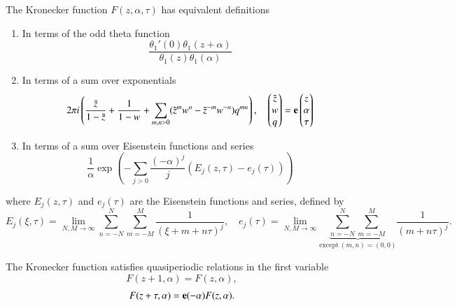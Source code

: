 \begin{definition}
    The Kronecker function $F(z,\alpha,\tau)$ has equivalent definitions
    \begin{enumerate}
        \item In terms of the odd theta function
        \begin{equation}\frac{\theta_1'(0)\theta_1(z+\alpha)}{\theta_1(z)\theta_1(\alpha)}\end{equation}
        \item In terms of a sum over exponentials
        \begin{equation} 2\pi i \left(\frac{\tilde z}{1-\tilde z} + \frac{1}{1-w} + \sum_{m,n > 0} (\tilde z^m w^n - \tilde z^{-m} w^{-n}) q^{mn}\right) , \quad \begin{pmatrix} \tilde z \\ w \\ q \end{pmatrix} = \mathbf{e} \begin{pmatrix}z \\ \alpha \\ \tau\end{pmatrix} \label{eqnB12:KroneckerSecondDef} \end{equation}
        \item In terms of a sum over Eisenstein functions and series
        \begin{equation}\frac{1}{\alpha} \exp\left(-\sum_{j > 0} \frac{(-\alpha)^j}{j} (E_j(z,\tau) - e_j(\tau))\right)\end{equation}
    \end{enumerate}
    where $E_j(z,\tau)$ and $e_j(\tau)$ are the Eisenstein functions and series, defined by
    \begin{equation}
        E_j(\xi,\tau) = \lim_{N,M\rightarrow \infty} \sum_{n=-N}^N \sum_{m=-M}^M \frac{1}{(\xi+m+n\tau)^j}, \quad e_j(\tau) = \lim_{N,M\rightarrow \infty} \underset{\mathrm{except \ }(m,n)=(0,0)}{\underbrace{\sum_{n=-N}^N \sum_{m=-M}^M}} \frac{1}{(m+n\tau)^j}.
    \end{equation}

    The Kronecker function satisfies quasiperiodic relations in the first variable
    \begin{equation}
        F(z+1,\alpha)=F(z,\alpha),
    \end{equation}
    \begin{equation}
        F(z+\tau,\alpha)=\mathbf{e}(-\alpha)F(z,\alpha).
    \end{equation}
\end{definition}

